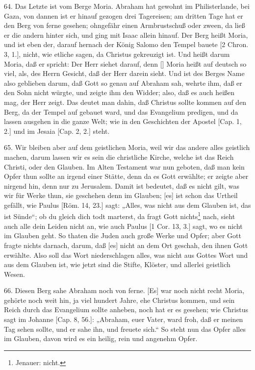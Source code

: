 64. Das Letzte ist vom Berge Moria. Abraham hat gewohnt im Philisterlande, bei Gaza, von dannen ist er hinauf gezogen drei Tagereisen; am dritten Tage hat er den Berg von ferne gesehen; ohngefähr einen Armbrustschuß oder zween, da ließ er die andern hinter sich, und ging mit Isaac allein hinauf. Der Berg heißt Moria, und ist eben der, darauf hernach der König Salomo den Tempel bauete [2 Chron. 3, 1.], nicht, wie etliche sagen, da Christus gekreuzigt ist. Und heißt darum Moria, daß er spricht: Der Herr siehet darauf, denn [] Moria heißt auf deutsch so viel, als, des
Herrn Gesicht, daß der Herr darein sieht. Und ist des Berges Name also geblieben darum, daß Gott so genau auf Abraham sah, wehrte ihm, daß er den Sohn nicht würgte, und zeigte ihm den Widder; also, daß es auch heißen mag, der Herr zeigt. Das deutet man dahin, daß Christus sollte kommen auf den Berg, da der Tempel auf gebauet ward, und das Evangelium predigen, und da lassen ausgehen in die ganze Welt; wie in den Geschichten der Apostel [Cap. 1, 2.] und im Jesaia [Cap. 2, 2.] steht.

65. Wir bleiben aber auf dem geistlichen Moria, weil wir das andere alles geistlich machen, darum lassen wir es sein die christliche Kirche, welche ist das Reich Christi, oder den Glauben. Im Alten Testament war nun geboten, daß man kein Opfer thun sollte an irgend einer Stätte, denn da es Gott erwählte; er zeigte aber nirgend hin, denn nur zu Jerusalem. Damit ist bedeutet, daß es nicht gilt, was wir für Werke thun, sie geschehen denn im Glauben; [es] ist schon das Urtheil gefällt, wie Paulus [Röm. 14, 23.] sagt: „Alles, was nicht aus dem Glauben ist, das ist Sünde“; ob du gleich dich todt marterst, da fragt Gott nichts\footnote{Jenauer: nicht.} nach, sieht auch alle dein Leiden nicht an, wie auch Paulus [1 Cor. 13, 3.] sagt, wo es nicht im Glauben geht. So thaten die Juden auch große Werke und Opfer; aber Gott fragte nichts darnach, darum, daß [es] nicht an dem Ort geschah, den ihnen Gott erwählte. Also soll das Wort niederschlagen alles, was nicht aus Gottes Wort und aus dem Glauben ist, wie jetzt sind die Stifte, Klöster, und allerlei geistlich Wesen.

66. Diesen Berg sahe Abraham noch von ferne. [Es] war noch nicht recht Moria, gehörte noch weit hin, ja viel hundert Jahre, ehe Christus kommen, und sein Reich durch das Evangelium sollte anheben, noch hat er es gesehen; wie Christus sagt im Johanne [Cap. 8, 56.]: „Abraham, euer Vater, ward froh, daß er meinen Tag sehen sollte, und er sahe ihn, und freuete sich.“ So steht nun das Opfer alles im Glauben, davon wird es ein heilig, rein und angenehm Opfer.

